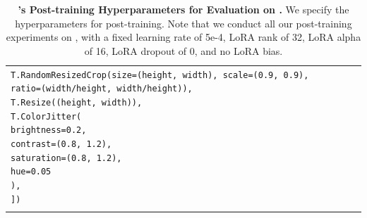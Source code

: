 \begin{table}[!htbp]
\begin{tabular}{l*{3}{>{\centering\arraybackslash}p{2.8cm}}}
{{\texttt{\hspace*{1em}T.RandomResizedCrop(size=(height, width), scale=(0.9, 0.9), ratio=(width/height, width/height)),}\\
\texttt{\hspace*{1em}T.Resize((height, width)),}\\
\texttt{\hspace*{1em}T.ColorJitter(}\\
\texttt{\hspace*{2em}brightness=0.2,}\\
\texttt{\hspace*{2em}contrast=(0.8, 1.2),}\\
\texttt{\hspace*{2em}saturation=(0.8, 1.2),}\\
\texttt{\hspace*{2em}hue=0.05}\\
\texttt{\hspace*{1em}),}\\
\texttt{])}
}} \\
\addlinespace[4pt]  
\bottomrule
\end{tabular}
\caption{\textbf{\molmoact's Post-training Hyperparameters for Evaluation on \molmoactdata.} We specify the hyperparameters for \molmoact post-training. Note that we conduct all our post-training experiments on \molmoactd, with a fixed learning rate of 5e-4, LoRA rank of 32, LoRA alpha of 16, LoRA dropout of 0, and no LoRA bias.}
\label{tab:hyperparams_real_ablation}
\end{table}